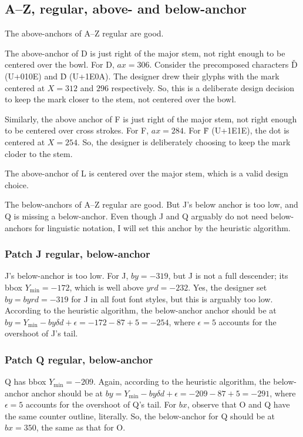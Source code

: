 \documentclass[landscape]{article}
\begin{document}
\subsection*{A--Z, regular, above- and below-anchor}

The above-anchors of A--Z regular are good. 

The above-anchor of D is just right of the major stem, not right enough to be centered over the bowl.
For D, $ax = 306$.
Consider the precomposed characters Ď (U+010E) and Ḋ (U+1E0A).
The designer drew their glyphs with the mark centered at $X = 312$ and $296$ respectively.
So, this is a deliberate design decision to keep the mark closer to the stem, not centered over the bowl.

Similarly, the above anchor of F is just right of the major stem, not right enough to be centered over cross strokes.
For F, $ax = 284$.
For Ḟ (U+1E1E), the dot is centered at $X = 254$.
So, the designer is deliberately choosing to keep the mark cloder to the stem.

The above-anchor of L is centered over the major stem, which is a valid design choice.

The below-anchors of A--Z regular are good. 
But J's below anchor is too low, and Q is missing a below-anchor.
Even though J and Q arguably do not need below-anchors for linguistic notation, 
I will set this anchor by the heuristic algorithm.

\subsubsection*{Patch J regular, below-anchor}

J's below-anchor is too low.
For J, $by = -319$, but J is not a full descender; 
its bbox $Y_\mathrm{min} = -172$, which is well above $yrd = -232$.
Yes, the designer set $by = byrd = -319$ for J in all fout font styles, but this is arguably too low.
According to the heuristic algorithm, the below-anchor anchor should be at 
$by = Y_\mathrm{min} - by\delta d + \epsilon = -172 -87 + 5 = -254$, 
where $\epsilon = 5$ accounts for the overshoot of J's tail.

\subsubsection*{Patch Q regular, below-anchor}

Q has bbox $Y_\mathrm{min} = -209$.
Again, according to the heuristic algorithm, the below-anchor anchor should be at 
$by = Y_\mathrm{min} - by\delta d + \epsilon = -209 -87 + 5 = -291$, 
where $\epsilon = 5$ accounts for the overshoot of Q's tail.
For $bx$, observe that O and Q have the same counter outline, literally.
So, the below-anchor for Q should be at $bx = 350$, the same as that for O.
\end{document}
